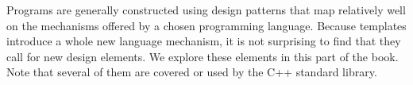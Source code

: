 Programs are generally constructed using design patterns that map relatively well on the mechanisms offered by a chosen programming language. Because templates introduce a whole new language mechanism, it is not surprising to find that they call for new design elements. We explore these elements in this part of the book. Note that several of them are covered or used by the C++ standard library.